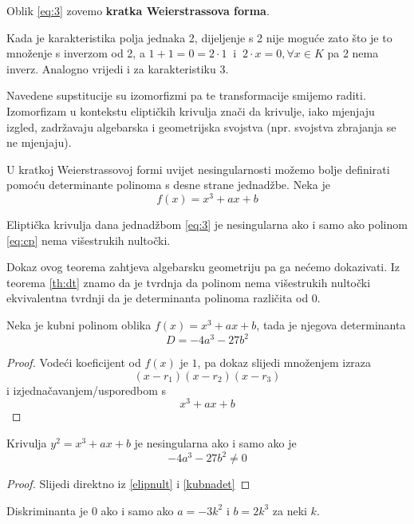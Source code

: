 \documentclass{mathos}
\begin{document}
Oblik \ref{eq:3} zovemo \textbf{kratka Weierstrassova forma}.

\begin{nap}
    Kada je karakteristika polja jednaka 2, dijeljenje s 2 nije moguće zato što je to množenje s inverzom od 2, a $1 + 1 = 0 = 2 \cdot 1 \ $ i $ \ 2\cdot x = 0, \forall x \in K$ pa 2 nema inverz.
    Analogno vrijedi i za karakteristiku 3.
\end{nap}
\begin{nap}
    Navedene supstitucije su izomorfizmi pa te transformacije smijemo raditi. Izomorfizam u kontekstu eliptičkih krivulja znači da krivulje, iako mjenjaju izgled, zadržavaju algebarska i geometrijska svojstva (npr. svojstva zbrajanja se ne mjenjaju).
\end{nap}

U kratkoj Weierstrassovoj formi uvijet nesingularnosti možemo bolje definirati pomoću determinante polinoma s desne strane jednadžbe. Neka je
\begin{equation}
    \label{eq:cp}
    f(x) = x^3 + ax + b 
\end{equation}
\begin{theorem}
    \label{elipnult}
    Eliptička krivulja dana jednadžbom \ref{eq:3} je nesingularna ako i samo ako polinom \ref{eq:cp} nema višestrukih nultočki.
\end{theorem}
Dokaz ovog teorema zahtjeva algebarsku geometriju pa ga nećemo dokazivati. Iz teorema \ref{th:dt} znamo da je tvrdnja da polinom nema višestrukih nultočki ekvivalentna tvrdnji da je determinanta polinoma različita od $0$.
\begin{propozicija}
    \label{kubnadet}
    Neka je kubni polinom oblika $f(x) = x^3 + ax + b$, tada je njegova determinanta
    \[ D = -4a^3 - 27b^2 \]
\end{propozicija}
\begin{proof}
    Vodeći koeficijent od $f(x)$ je $1$, pa dokaz slijedi množenjem izraza \[(x - r_1)(x - r_2)(x - r_3)\] i izjednačavanjem/usporedbom s \[x^3 + ax + b\]
\end{proof}
\begin{korolar}
    Krivulja $y^2 = x^3 + ax + b$ je nesingularna ako i samo ako je
    \[ -4a^3 - 27b^2 \neq 0 \]
\end{korolar}
\begin{proof}
    Slijedi direktno iz \ref{elipnult} i \ref{kubnadet}
\end{proof}
\begin{nap}
    Diskriminanta je $0$ ako i samo ako $a = -3k^2$ i $b=2k^3$ za neki $k$.
\end{nap}
\end{document}
